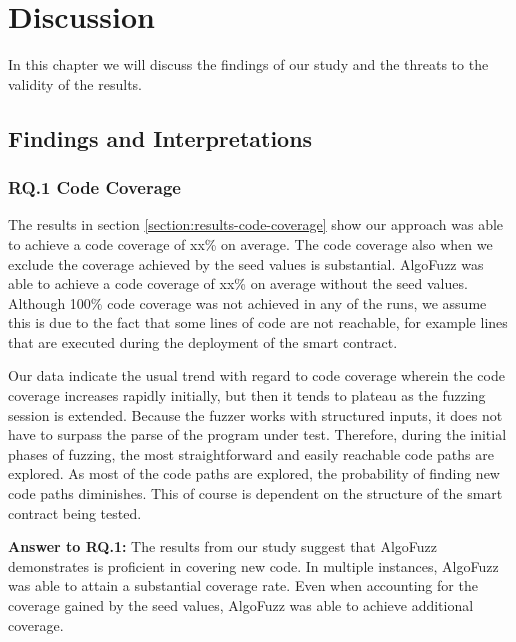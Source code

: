 
\chapter{Discussion}\label{chapter:discussion}
In this chapter we will discuss the findings of our study and the threats to the validity of the results.

\section{Findings and Interpretations}

\subsection*{RQ.1 Code Coverage}
The results in section \ref{section:results-code-coverage} show our approach was able to achieve a code coverage of xx\% on average.
The code coverage also when we exclude the coverage achieved by the seed values is substantial.
AlgoFuzz was able to achieve a code coverage of xx\% on average without the seed values.
Although 100\% code coverage was not achieved in any of the runs, we assume this is due to the fact that some lines of code are not reachable, for example lines that are executed during the deployment of the smart contract.

Our data indicate the usual trend with regard to code coverage wherein the code coverage increases rapidly initially, but then it tends to plateau as the fuzzing session is extended.
Because the fuzzer works with structured inputs, it does not have to surpass the parse of the program under test.
Therefore, during the initial phases of fuzzing, the most straightforward and easily reachable code paths are explored.
As most of the code paths are explored, the probability of finding new code paths diminishes.
This of course is dependent on the structure of the smart contract being tested.

\begin{mybox}
    \textbf{Answer to RQ.1:} The results from our study suggest that AlgoFuzz demonstrates is proficient in covering new code.
    In multiple instances, AlgoFuzz was able to attain a substantial coverage rate.
    Even when accounting for the coverage gained by the seed values, AlgoFuzz was able to achieve additional coverage.
\end{mybox}

